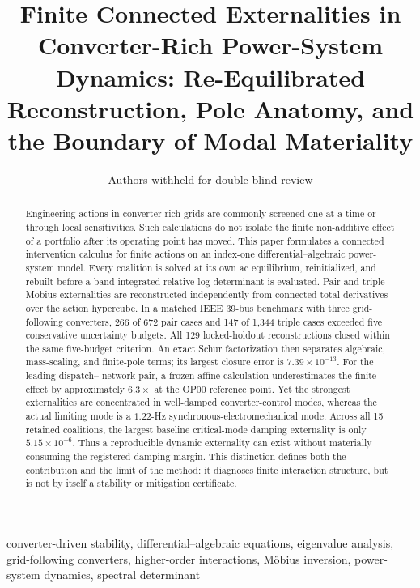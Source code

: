 \documentclass[journal]{IEEEtran}
\title{Finite Connected Externalities in Converter-Rich Power-System
Dynamics: Re-Equilibrated Reconstruction, Pole Anatomy, and the Boundary of
Modal Materiality}
\author{Authors withheld for double-blind review}
\begin{document}
\maketitle

\begin{abstract}
Engineering actions in converter-rich grids are commonly screened one at a
time or through local sensitivities. Such calculations do not isolate the
finite non-additive effect of a portfolio after its operating point has moved.
This paper formulates a connected intervention calculus for finite actions on
an index-one differential--algebraic power-system model. Every coalition is
solved at its own ac equilibrium, reinitialized, and rebuilt before a
band-integrated relative log-determinant is evaluated. Pair and triple
M\"obius externalities are reconstructed independently from connected total
derivatives over the action hypercube. In a matched IEEE 39-bus benchmark with
three grid-following converters, 266 of 672 pair cases and 147 of 1,344 triple
cases exceeded five conservative uncertainty budgets. All 129 locked-holdout
reconstructions closed within the same five-budget criterion. An exact Schur
factorization then separates algebraic, mass-scaling, and finite-pole terms;
its largest closure error is $7.39\times10^{-13}$. For the leading dispatch--
network pair, a frozen-affine calculation underestimates the finite effect by
approximately $6.3\times$ at the OP00 reference point. Yet the strongest
externalities are concentrated in well-damped converter-control modes, whereas
the actual limiting mode is a $1.22$-Hz synchronous-electromechanical mode.
Across all 15 retained coalitions, the largest baseline critical-mode damping
externality is only $5.15\times10^{-6}$. Thus a reproducible dynamic
externality can exist without materially consuming the registered damping
margin. This distinction defines both the contribution and the limit of the
method: it diagnoses finite interaction structure, but is not by itself a
stability or mitigation certificate.
\end{abstract}

\begin{IEEEkeywords}
converter-driven stability, differential--algebraic equations, eigenvalue
analysis, grid-following converters, higher-order interactions, M\"obius
inversion, power-system dynamics, spectral determinant
\end{IEEEkeywords}









\end{document}
